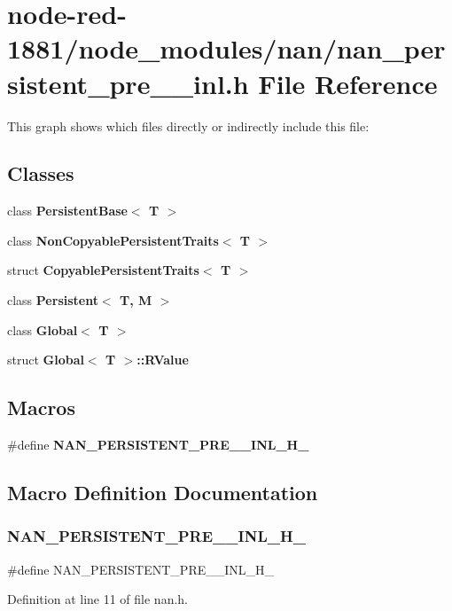 \section{node-\/red-\/1881/node\+\_\+modules/nan/nan\+\_\+persistent\+\_\+pre\+\_\+\_\+inl.h File Reference}
\label{nan__persistent__pre__12__inl_8h}
This graph shows which files directly or indirectly include this file\+:
\subsection*{Classes}
\begin{DoxyCompactItemize}
\item 
class \textbf{ Persistent\+Base$<$ T $>$}
\item 
class \textbf{ Non\+Copyable\+Persistent\+Traits$<$ T $>$}
\item 
struct \textbf{ Copyable\+Persistent\+Traits$<$ T $>$}
\item 
class \textbf{ Persistent$<$ T, M $>$}
\item 
class \textbf{ Global$<$ T $>$}
\item 
struct \textbf{ Global$<$ T $>$\+::\+R\+Value}
\end{DoxyCompactItemize}
\subsection*{Macros}
\begin{DoxyCompactItemize}
\item 
\#define \textbf{ N\+A\+N\+\_\+\+P\+E\+R\+S\+I\+S\+T\+E\+N\+T\+\_\+\+P\+R\+E\+\_\+\_\+\+I\+N\+L\+\_\+\+H\+\_\+}
\end{DoxyCompactItemize}


\subsection{Macro Definition Documentation}
\mbox{\label{nan_8h_ae094f2b43d7bec06970093e38537656f}} 
\subsubsection{N\+A\+N\+\_\+\+P\+E\+R\+S\+I\+S\+T\+E\+N\+T\+\_\+\+P\+R\+E\+\_\+\_\+\+I\+N\+L\+\_\+\+H\+\_\+}
{\footnotesize\ttfamily \#define N\+A\+N\+\_\+\+P\+E\+R\+S\+I\+S\+T\+E\+N\+T\+\_\+\+P\+R\+E\+\_\+\_\+\+I\+N\+L\+\_\+\+H\+\_\+}



Definition at line 11 of file nan.\+h.

